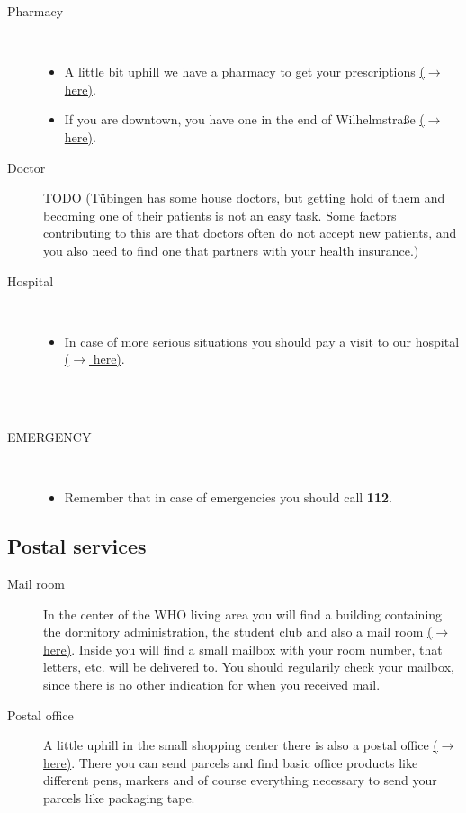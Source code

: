 \begin{description}
    \item[Pharmacy] \ \
        \begin{itemize}
            \item A little bit uphill we have a pharmacy to get your prescriptions \href{https://maps.app.goo.gl/cpDLc9VZ7XukpgS18}{($\xrightarrow{}$ here)}.
            \item If you are downtown, you have one in the end of Wilhelmstraße \href{https://maps.app.goo.gl/YXwvVpp81eTSZeJW7}{($\xrightarrow{}$ here)}.
        \end{itemize}
    \item[Doctor]
    {\color{darkred} TODO} (Tübingen has some house doctors, but getting hold of them and becoming one of their patients is not an easy task. Some factors contributing to this are that doctors often do not accept new patients, and you also need to find one that partners with your health insurance.)
    \item[Hospital] \ \
        \begin{itemize}
            \item In case of more serious situations you should pay a visit to our hospital \href{https://maps.app.goo.gl/EHyduztd2QgxTVer9}{($\xrightarrow{}$ here)}.
        \end{itemize}
    \ \\ \   
    \item[EMERGENCY] \ \
        \begin{itemize}
            \item Remember that in case of emergencies you should call \textbf{112}.
        \end{itemize}
\end{description}

\subsection{Postal services}
\begin{description}
    \item[Mail room]
    In the center of the WHO living area you will find a building containing the dormitory administration, the student club  and also a mail room \href{https://maps.app.goo.gl/W9UtqfhE1LJJ5oGH8}{($\xrightarrow{}$ here)}. Inside you will find a small mailbox with your room number, that letters, etc. will be delivered to. You should regularily check your mailbox, since there is no other indication for when you received mail.

    \item[Postal office]
    A little uphill in the small  shopping center there is also a postal office \href{https://maps.app.goo.gl/nMnEheHexNQ5NZY37}{($\xrightarrow{}$ here)}. There you can send parcels and find basic office products like different pens, markers and of course everything necessary to send your parcels like packaging tape.
\end{description}

